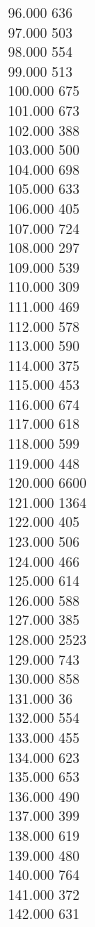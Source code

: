 { 96.000	636 \\
 97.000	503 \\
 98.000	554 \\
 99.000	513 \\
 100.000	675 \\
 101.000	673 \\
 102.000	388 \\
 103.000	500 \\
 104.000	698 \\
 105.000	633 \\
 106.000	405 \\
 107.000	724 \\
 108.000	297 \\
 109.000	539 \\
 110.000	309 \\
 111.000	469 \\
 112.000	578 \\
 113.000	590 \\
 114.000	375 \\
 115.000	453 \\
 116.000	674 \\
 117.000	618 \\
 118.000	599 \\
 119.000	448 \\
 120.000	6600 \\
 121.000	1364 \\
 122.000	405 \\
 123.000	506 \\
 124.000	466 \\
 125.000	614 \\
 126.000	588 \\
 127.000	385 \\
 128.000	2523 \\
 129.000	743 \\
 130.000	858 \\
 131.000	36 \\
 132.000	554 \\
 133.000	455 \\
 134.000	623 \\
 135.000	653 \\
 136.000	490 \\
 137.000	399 \\
 138.000	619 \\
 139.000	480 \\
 140.000	764 \\
 141.000	372 \\
 142.000	631 \\
}
